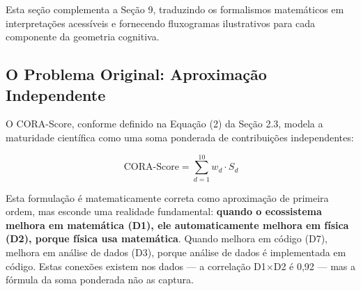 ﻿%


Esta seção complementa a Seção 9, traduzindo os formalismos matemáticos
em interpretações acessíveis e fornecendo fluxogramas ilustrativos para
cada componente da geometria cognitiva.

\subsection{O Problema Original: Aproximação Independente}

O CORA-Score, conforme definido na Equação (2) da Seção 2.3, modela a
maturidade científica como uma soma ponderada de contribuições independentes:

\begin{equation}
\text{CORA-Score} = \sum_{d=1}^{10} w_d \cdot S_d
\end{equation}

Esta formulação é matematicamente correta como aproximação de primeira ordem,
mas esconde uma realidade fundamental: \textbf{quando o ecossistema melhora em
matemática (D1), ele automaticamente melhora em física (D2), porque física usa
matemática}. Quando melhora em código (D7), melhora em análise de dados (D3),
porque análise de dados é implementada em código. Estas conexões existem nos
dados --- a correlação D1$\times$D2 é 0,92 --- mas a fórmula da soma ponderada
não as captura.

